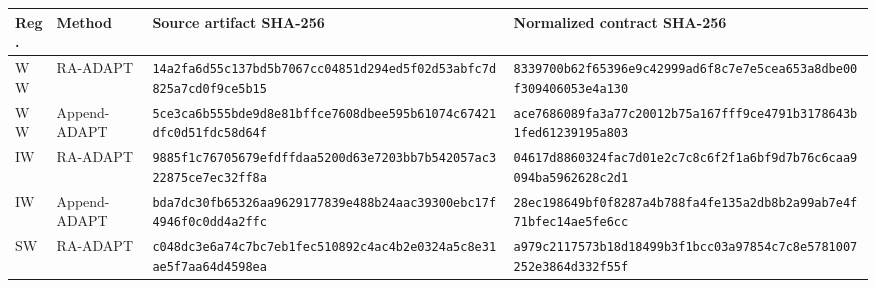 \documentclass[10pt,letterpaper]{article}
\begin{document}
\tiny
\begin{longtable}{@{}llp{2.55in}p{2.55in}@{}}
\toprule
Reg. & Method & Source artifact SHA-256 & Normalized contract SHA-256 \\
\midrule
WW & RA-ADAPT & \texttt{14a2fa6d}\allowbreak{}\texttt{55c137bd}\allowbreak{}\texttt{5b7067cc}\allowbreak{}\texttt{04851d29}\allowbreak{}\texttt{4ed5f02d}\allowbreak{}\texttt{53abfc7d}\allowbreak{}\texttt{825a7cd0}\allowbreak{}\texttt{f9ce5b15}\allowbreak{} & \texttt{8339700b}\allowbreak{}\texttt{62f65396}\allowbreak{}\texttt{e9c42999}\allowbreak{}\texttt{ad6f8c7e}\allowbreak{}\texttt{7e5cea65}\allowbreak{}\texttt{3a8dbe00}\allowbreak{}\texttt{f3094060}\allowbreak{}\texttt{53e4a130}\allowbreak{} \\
WW & Append-ADAPT & \texttt{5ce3ca6b}\allowbreak{}\texttt{555bde9d}\allowbreak{}\texttt{8e81bffc}\allowbreak{}\texttt{e7608dbe}\allowbreak{}\texttt{e595b610}\allowbreak{}\texttt{74c67421}\allowbreak{}\texttt{dfc0d51f}\allowbreak{}\texttt{dc58d64f}\allowbreak{} & \texttt{ace76860}\allowbreak{}\texttt{89fa3a77}\allowbreak{}\texttt{c20012b7}\allowbreak{}\texttt{5a167fff}\allowbreak{}\texttt{9ce4791b}\allowbreak{}\texttt{3178643b}\allowbreak{}\texttt{1fed6123}\allowbreak{}\texttt{9195a803}\allowbreak{} \\
IW & RA-ADAPT & \texttt{9885f1c7}\allowbreak{}\texttt{6705679e}\allowbreak{}\texttt{fdffdaa5}\allowbreak{}\texttt{200d63e7}\allowbreak{}\texttt{203bb7b5}\allowbreak{}\texttt{42057ac3}\allowbreak{}\texttt{22875ce7}\allowbreak{}\texttt{ec32ff8a}\allowbreak{} & \texttt{04617d88}\allowbreak{}\texttt{60324fac}\allowbreak{}\texttt{7d01e2c7}\allowbreak{}\texttt{c8c6f2f1}\allowbreak{}\texttt{a6bf9d7b}\allowbreak{}\texttt{76c6caa9}\allowbreak{}\texttt{094ba596}\allowbreak{}\texttt{2628c2d1}\allowbreak{} \\
IW & Append-ADAPT & \texttt{bda7dc30}\allowbreak{}\texttt{fb65326a}\allowbreak{}\texttt{a9629177}\allowbreak{}\texttt{839e488b}\allowbreak{}\texttt{24aac393}\allowbreak{}\texttt{00ebc17f}\allowbreak{}\texttt{4946f0c0}\allowbreak{}\texttt{dd4a2ffc}\allowbreak{} & \texttt{28ec1986}\allowbreak{}\texttt{49bf0f82}\allowbreak{}\texttt{87a4b788}\allowbreak{}\texttt{fa4fe135}\allowbreak{}\texttt{a2db8b2a}\allowbreak{}\texttt{99ab7e4f}\allowbreak{}\texttt{71bfec14}\allowbreak{}\texttt{ae5fe6cc}\allowbreak{} \\
SW & RA-ADAPT & \texttt{c048dc3e}\allowbreak{}\texttt{6a74c7bc}\allowbreak{}\texttt{7eb1fec5}\allowbreak{}\texttt{10892c4a}\allowbreak{}\texttt{c4b2e032}\allowbreak{}\texttt{4a5c8e31}\allowbreak{}\texttt{ae5f7aa6}\allowbreak{}\texttt{4d4598ea}\allowbreak{} & \texttt{a979c211}\allowbreak{}\texttt{7573b18d}\allowbreak{}\texttt{18499b3f}\allowbreak{}\texttt{1bcc03a9}\allowbreak{}\texttt{7854c7c8}\allowbreak{}\texttt{e5781007}\allowbreak{}\texttt{252e3864}\allowbreak{}\texttt{d332f55f}\allowbreak{} \\

\end{longtable}
\end{document}
